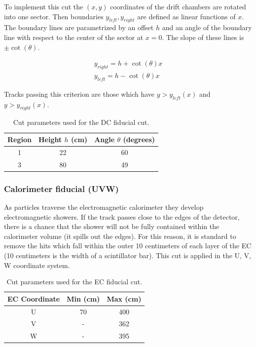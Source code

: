 To implement this cut the $(x,y)$ coordinates of the drift chambers are rotated into one sector.  Then boundaries $y_{left}, y_{right}$ are defined as linear functions of $x$. The boundary lines are parametrized by an offset $h$ and an angle of the boundary line with respect to the center of the sector at $x = 0$.  The slope of these lines is $\pm \cot(\theta)$.  

\begin{eqnarray}
  y_{right} = h + \cot(\theta) x \\
  y_{left} = h - \cot(\theta) x
\end{eqnarray}

Tracks passing this criterion are those which have $y > y_{left}(x)$ and $y > y_{right}(x)$.  

\begin{table}
  \centering
  \begin{tabular}{c|c|c}
    Region & Height $h$ (cm) & Angle $\theta$ (degrees)\\
    \hline 
    1 & 22 & 60 \\
    3 & 80 & 49
  \end{tabular}
  \caption{Cut parameters used for the DC fiducial cut.}
\end{table}


\subsubsection{Calorimeter fiducial (UVW)}
As particles traverse the electromagnetic calorimeter they develop electromagnetic showers.  If the track passes close to the edges of the detector, there is a chance that the shower will not be fully contained within the calorimeter volume (it spills out the edges).  For this reason, it is standard to remove the hits which fall within the outer 10 centimeters of each layer of the EC (10 centimeters is the width of a scintillator bar).  This cut is applied in the U, V, W coordinate system.  

\begin{table}
  \centering
  \begin{tabular}{c|c|c}
    EC Coordinate & Min (cm) & Max (cm) \\
    \hline 
    U & 70 & 400 \\
    V & - & 362 \\
    W & - & 395
  \end{tabular}
  \caption{Cut parameters used for the EC fiducial cut.}
\end{table}


